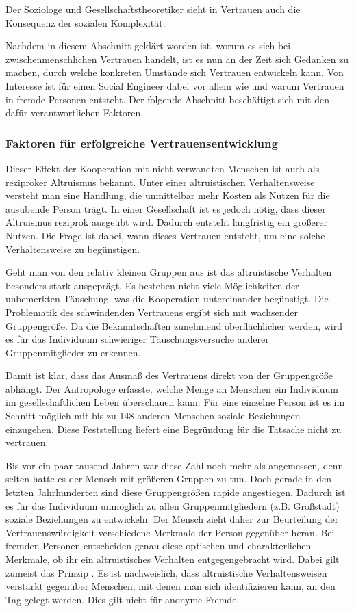 Der Soziologe und Gesellschaftstheoretiker  sieht in Vertrauen auch die Konsequenz der sozialen Komplexität.
\citep{luhmann2000vertrauen}


Nachdem in diesem Abschnitt geklärt worden ist, worum es sich bei zwischenmenschlichen Vertrauen handelt, ist es nun an der Zeit sich Gedanken zu machen, durch welche konkreten Umstände sich Vertrauen entwickeln kann.
Von Interesse ist für einen Social Engineer dabei vor allem wie und warum Vertrauen in fremde Personen entsteht.
Der folgende Abschnitt beschäftigt sich mit den dafür verantwortlichen Faktoren.

\subsubsection{Faktoren für erfolgreiche Vertrauensentwicklung}
Dieser Effekt der Kooperation mit nicht-verwandten Menschen ist auch als reziproker Altruismus bekannt. Unter einer altruistischen Verhaltensweise versteht man eine Handlung, die unmittelbar mehr Kosten als Nutzen für die ausübende Person trägt.
In einer Gesellschaft ist es jedoch nötig, dass dieser Altruismus reziprok ausgeübt wird. Dadurch entsteht langfristig ein größerer Nutzen.
Die Frage ist dabei, wann dieses Vertrauen entsteht, um eine solche Verhaltensweise zu begünstigen.

Geht man von den relativ kleinen Gruppen aus ist das altruistische Verhalten besonders stark ausgeprägt. Es bestehen nicht viele Möglichkeiten der unbemerkten Täuschung, was die Kooperation untereinander begünstigt.
Die Problematik des schwindenden Vertrauens ergibt sich mit wachsender Gruppengröße.
Da die Bekanntschaften zunehmend oberflächlicher werden, wird es für das Individuum schwieriger Täuschungsversuche anderer Gruppenmitglieder zu erkennen.

Damit ist klar, dass das Ausmaß des Vertrauens direkt von der Gruppengröße abhängt. Der Antropologe  erfasste, welche Menge an Menschen ein Individuum im gesellschaftlichen Leben überschauen kann.
Für eine einzelne Person ist es im Schnitt möglich mit bis zu 148 anderen Menschen soziale Beziehungen einzugehen. Diese Feststellung liefert eine Begründung für die Tatsache  nicht zu vertrauen.
\citep{dunbar2010how}

Bis vor ein paar tausend Jahren war diese Zahl noch mehr als angemessen, denn selten hatte es der Mensch mit größeren Gruppen zu tun. Doch gerade in den letzten Jahrhunderten sind diese Gruppengrößen rapide angestiegen.
Dadurch ist es für das Individuum unmöglich zu allen Gruppenmitgliedern (z.B. Großstadt) soziale Beziehungen zu entwickeln.
Der Mensch zieht daher zur Beurteilung der Vertrauenswürdigkeit verschiedene Merkmale der Person gegenüber heran.
Bei fremden Personen entscheiden genau diese optischen und charakterlichen Merkmale, ob ihr ein altruistisches Verhalten entgegengebracht wird. Dabei gilt zumeist das Prinzip .
Es ist nachweislich, dass altruistische Verhaltensweisen verstärkt gegenüber Menschen, mit denen man sich identifizieren kann, an den Tag gelegt werden.
Dies gilt nicht für anonyme Fremde.

